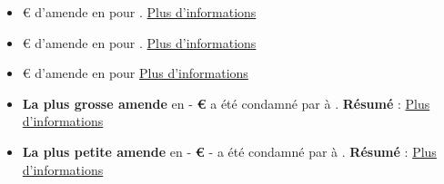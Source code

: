 \documentclass[french]{article}
\begin{document}
\newpage
\justify
	\begin{multicols}{2}
		\begin{itemize}
			\item \textbf{} \newline
			€ d'amende en  pour .
			\newline
			\newline
			\href{\VAR{new1_link}}{Plus d'informations}
			\vspace{1cm}
	
			\item \textbf{} \newline
			€ d'amende en  pour .
			\newline
			\newline
			\href{\VAR{new2_link}}{Plus d'informations}
			\vspace{1cm}
	
			\item \textbf{} \newline {}€ d'amende en  pour 
			\newline
			\newline
			\href{\VAR{new3_link}}{Plus d'informations}
		\end{itemize}
	\end{multicols}

\newpage
\justify
	\begin{multicols}{2}
	\begin{itemize}
		\item \textbf{La plus grosse amende} en  - \textbf{ €} a été condamné par  à .
		\newline
		\textbf{Résumé} : 
		\newline
		\href{\VAR{largest_fine_link}}{Plus d'informations}
		\vspace{1cm}
	
		\item \textbf{La plus petite amende} en  - \textbf{ €} -  a été condamné par  à .
		\newline
		\textbf{Résumé} : 
		\newline
		\href{\VAR{lowest_fine_link}}{Plus d'informations}
	\end{itemize}
	\end{multicols}
\end{document}
